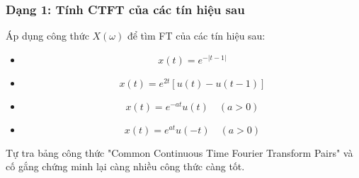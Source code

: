 \documentclass{article}
\begin{document}
\subsubsection{Dạng 1: Tính CTFT của các tín hiệu sau}
Áp dụng công thức $X(\omega)$ để tìm FT của các tín hiệu sau:
\begin{itemize}
    \item $$x(t)=e^{-|t-1|}$$
    \item $$x(t)=e^{2t}[u(t)-u(t-1)]$$
    \item $$x(t)=e^{-at}u(t) \quad(a>0)$$
    \item $$x(t)=e^{at}u(-t) \quad(a>0)$$
\end{itemize}
Tự tra bảng công thức "Common Continuous Time Fourier Transform Pairs" và cố gắng chứng minh lại càng nhiều công thức càng tốt.
\end{document}
